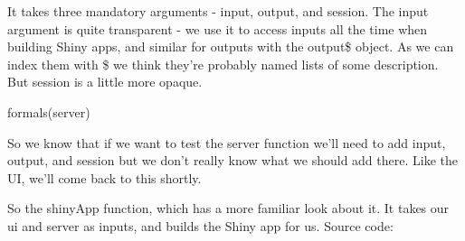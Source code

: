 \documentclass[
  letterpaper,
  DIV=11,
  numbers=noendperiod]{scrreprt}
\newenvironment{Shaded}{\begin{snugshade}}{\end{snugshade}}
\newcommand{\AttributeTok}[1]{\textcolor[rgb]{0.40,0.45,0.13}{#1}}
\newcommand{\ConstantTok}[1]{\textcolor[rgb]{0.56,0.35,0.01}{#1}}
\newcommand{\ControlFlowTok}[1]{\textcolor[rgb]{0.00,0.23,0.31}{\textbf{#1}}}
\newcommand{\FunctionTok}[1]{\textcolor[rgb]{0.28,0.35,0.67}{#1}}
\newcommand{\NormalTok}[1]{\textcolor[rgb]{0.00,0.23,0.31}{#1}}
\newcommand{\OtherTok}[1]{\textcolor[rgb]{0.00,0.23,0.31}{#1}}
\newcommand{\SpecialCharTok}[1]{\textcolor[rgb]{0.37,0.37,0.37}{#1}}
\newcommand{\StringTok}[1]{\textcolor[rgb]{0.13,0.47,0.30}{#1}}
\begin{document}
It takes three mandatory arguments - input, output, and session. The
input argument is quite transparent - we use it to access inputs all the
time when building Shiny apps, and similar for outputs with the output\$
object. As we can index them with \$ we think they're probably named
lists of some description. But session is a little more opaque.

\begin{Shaded}
\begin{Highlighting}[]
\FunctionTok{formals}\NormalTok{(server)}
\end{Highlighting}
\end{Shaded}

So we know that if we want to test the server function we'll need to add
input, output, and session but we don't really know what we should add
there. Like the UI, we'll come back to this shortly.

So the shinyApp function, which has a more familiar look about it. It
takes our ui and server as inputs, and builds the Shiny app for us.
Source code:

\begin{Shaded}
\end{Shaded}
\end{document}
